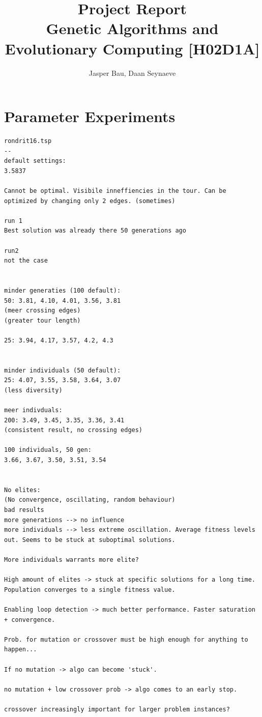 \documentclass{article}
\title{Project Report\\Genetic Algorithms and Evolutionary Computing [H02D1A]}
\author{Jasper Bau, Daan Seynaeve}
\begin{document}
\maketitle


\section{Parameter Experiments}

\begin{verbatim}
rondrit16.tsp
--
default settings:
3.5837

Cannot be optimal. Visibile inneffiencies in the tour. Can be optimized by changing only 2 edges. (sometimes)

run 1
Best solution was already there 50 generations ago

run2
not the case


minder generaties (100 default):
50: 3.81, 4.10, 4.01, 3.56, 3.81
(meer crossing edges)
(greater tour length)

25: 3.94, 4.17, 3.57, 4.2, 4.3


minder individuals (50 default):
25: 4.07, 3.55, 3.58, 3.64, 3.07
(less diversity)

meer indivduals:
200: 3.49, 3.45, 3.35, 3.36, 3.41
(consistent result, no crossing edges)

100 individuals, 50 gen:
3.66, 3.67, 3.50, 3.51, 3.54


No elites:
(No convergence, oscillating, random behaviour)
bad results
more generations --> no influence
more individuals --> less extreme oscillation. Average fitness levels out. Seems to be stuck at suboptimal solutions.

More individuals warrants more elite?

High amount of elites -> stuck at specific solutions for a long time. Population converges to a single fitness value.

Enabling loop detection -> much better performance. Faster saturation + convergence.

Prob. for mutation or crossover must be high enough for anything to happen...

If no mutation -> algo can become 'stuck'.

no mutation + low crossover prob -> algo comes to an early stop.

crossover increasingly important for larger problem instances?


\end{verbatim}
\end{document}
